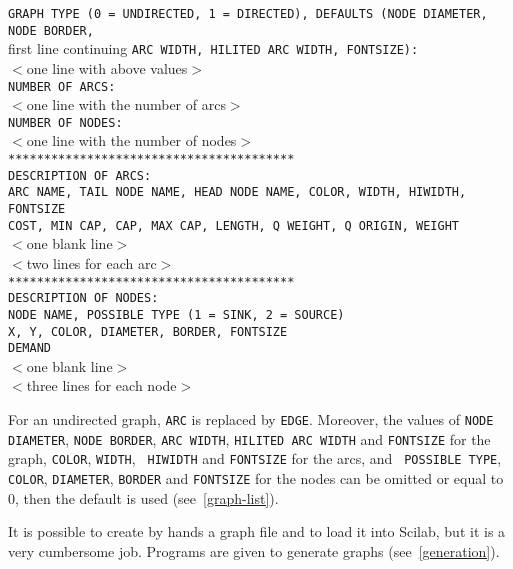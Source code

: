 \documentclass[11pt]{article}
\begin{document}
{\small \begin{tabbing}
\texttt{GRAPH TYPE (0 = UNDIRECTED, 1 = DIRECTED), DEFAULTS (NODE
DIAMETER, NODE BORDER,}\\
\qquad first line continuing \texttt{ARC WIDTH, HILITED ARC WIDTH, FONTSIZE):}\\
$<$one line with above values$>$\\
\texttt{NUMBER OF ARCS:}\\
$<$one line with the number of arcs$>$\\
\texttt{NUMBER OF NODES:}\\
$<$one line with the number of nodes$>$\\
\texttt{****************************************}\\
\texttt{DESCRIPTION OF ARCS:}\\
\texttt{ARC NAME, TAIL NODE NAME, HEAD NODE NAME, COLOR, WIDTH, HIWIDTH, FONTSIZE}\\
\texttt{COST, MIN CAP, CAP, MAX CAP, LENGTH, Q WEIGHT, Q ORIGIN, WEIGHT}\\
$<$one blank line$>$\\
$<$two lines for each arc$>$\\
\texttt{****************************************}\\
\texttt{DESCRIPTION OF NODES:}\\
\texttt{NODE NAME, POSSIBLE TYPE (1 = SINK, 2 = SOURCE)}\\
\texttt{X, Y, COLOR, DIAMETER, BORDER, FONTSIZE}\\
\texttt{DEMAND}\\
$<$one blank line$>$\\
$<$three lines for each node$>$
\end{tabbing}}

\noindent For an undirected graph, \texttt{\small ARC} is replaced by
\texttt{\small EDGE}.  Moreover, the values of \texttt{\small NODE
DIAMETER}, \texttt{\small NODE BORDER}, \texttt{\small ARC WIDTH},
\texttt{\small HILITED ARC WIDTH} and \texttt{\small FONTSIZE} for the
graph, \texttt{\small COLOR}, \texttt{\small WIDTH}, \texttt{\small
HIWIDTH} and \texttt{\small FONTSIZE} for the arcs, and \texttt{\small
POSSIBLE TYPE}, \texttt{\small COLOR}, \texttt{\small DIAMETER},
\texttt{\small BORDER} and \texttt{\small FONTSIZE} for the nodes can
be omitted or equal to 0, then the default is used
(see~\ref{graph-list}).

It is possible to create by hands a graph file and to load it into
Scilab, but it is a very cumbersome job. Programs are given to
generate graphs (see~\ref{generation}).
\end{document}
